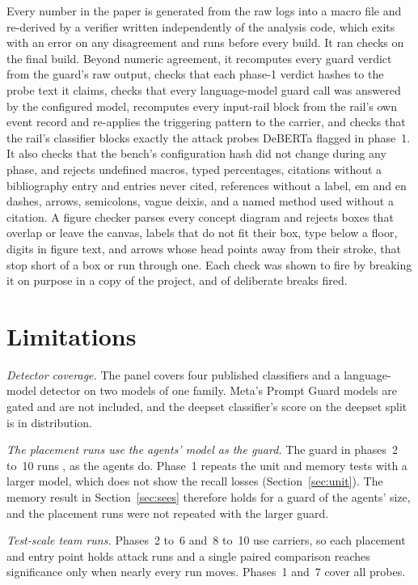 \documentclass[conference]{IEEEtran}
\begin{document}
Every number in the paper is generated from the raw logs into a macro file
and re-derived by a verifier written independently of the analysis code,
which exits with an error on any disagreement and runs before every build.
It ran \NVerifyChecks{} checks on the final build. Beyond numeric agreement,
it recomputes every guard verdict from the guard's raw output, checks that
each phase-1 verdict hashes to the probe text it claims, checks that every
language-model guard call was answered by the configured model, recomputes
every input-rail block from the rail's own event record and re-applies the
triggering pattern to the carrier, and checks that the rail's classifier
blocks exactly the attack probes DeBERTa flagged in phase~1. It also checks
that the bench's configuration hash did not change during any phase, and
rejects undefined macros, typed percentages, citations without a
bibliography entry and entries never cited, references without a label, em
and en dashes, arrows, semicolons, vague deixis, and a named method used
without a citation. A figure checker parses every concept diagram and
rejects boxes that overlap or leave the canvas, labels that do not fit their
box, type below a floor, digits in figure text, and arrows whose head points
away from their stroke, that stop short of a box or run through one. Each
check was shown to fire by breaking it on purpose in a copy of the project,
and \NBreakTestsFire{} of \NBreakTests{} deliberate breaks fired.

\section{Limitations}
\label{sec:limits}

\emph{Detector coverage.} The panel covers four published classifiers and a
language-model detector on two models of one family. Meta's Prompt Guard
models are gated and are not included, and the deepset classifier's score on
the deepset split is in distribution.

\emph{The placement runs use the agents' model as the guard.} The guard in
phases~2 to~10 runs \texttt{\AgentModel{}}, as the agents do. Phase~1
repeats the unit and memory tests with a larger model, which does not show
the recall losses (Section~\ref{sec:unit}). The memory result in
Section~\ref{sec:sees} therefore holds for a guard of the agents' size, and
the placement runs were not repeated with the larger guard.

\emph{Test-scale team runs.} Phases~2 to~6 and~8 to~10 use
\NTestCarriers{} carriers, so each placement and entry point holds
\NTestCarriers{} attack runs and a single paired comparison reaches
significance only when nearly every run moves. Phases~1 and~7 cover all
\NProbes{} probes.
\end{document}
